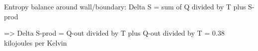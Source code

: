 Entropy balance around wall/boundary:  
Delta S = sum of Q divided by T plus S-prod  

=> Delta S-prod = Q-out divided by T plus Q-out divided by T  
= 0.38 kilojoules per Kelvin